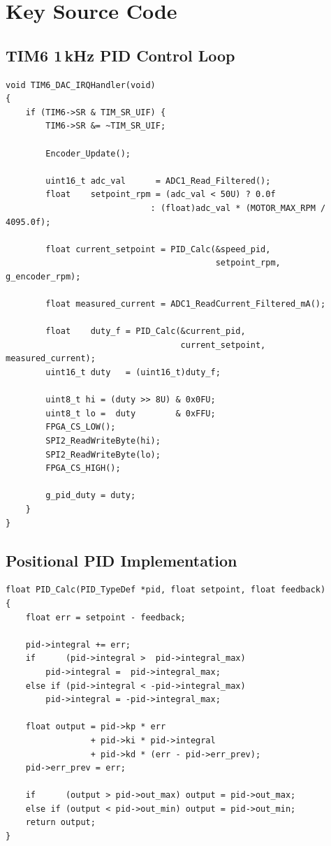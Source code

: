 \documentclass[12pt, a4paper]{report}
\begin{document}
\appendix

\chapter{Key Source Code}

\section{TIM6 1\,kHz PID Control Loop}

\begin{lstlisting}[style=cstyle, caption={TIM6\_DAC\_IRQHandler: 1\,kHz cascade PID loop.}]
void TIM6_DAC_IRQHandler(void)
{
    if (TIM6->SR & TIM_SR_UIF) {
        TIM6->SR &= ~TIM_SR_UIF;

        Encoder_Update();

        uint16_t adc_val      = ADC1_Read_Filtered();
        float    setpoint_rpm = (adc_val < 50U) ? 0.0f
                             : (float)adc_val * (MOTOR_MAX_RPM / 4095.0f);

        float current_setpoint = PID_Calc(&speed_pid,
                                          setpoint_rpm, g_encoder_rpm);

        float measured_current = ADC1_ReadCurrent_Filtered_mA();

        float    duty_f = PID_Calc(&current_pid,
                                   current_setpoint, measured_current);
        uint16_t duty   = (uint16_t)duty_f;

        uint8_t hi = (duty >> 8U) & 0x0FU;
        uint8_t lo =  duty        & 0xFFU;
        FPGA_CS_LOW();
        SPI2_ReadWriteByte(hi);
        SPI2_ReadWriteByte(lo);
        FPGA_CS_HIGH();

        g_pid_duty = duty;
    }
}
\end{lstlisting}

\section{Positional PID Implementation}

\begin{lstlisting}[style=cstyle, caption={PID\_Calc: positional PID with anti-windup.}]
float PID_Calc(PID_TypeDef *pid, float setpoint, float feedback)
{
    float err = setpoint - feedback;

    pid->integral += err;
    if      (pid->integral >  pid->integral_max)
        pid->integral =  pid->integral_max;
    else if (pid->integral < -pid->integral_max)
        pid->integral = -pid->integral_max;

    float output = pid->kp * err
                 + pid->ki * pid->integral
                 + pid->kd * (err - pid->err_prev);
    pid->err_prev = err;

    if      (output > pid->out_max) output = pid->out_max;
    else if (output < pid->out_min) output = pid->out_min;
    return output;
}
\end{lstlisting}
\end{document}

